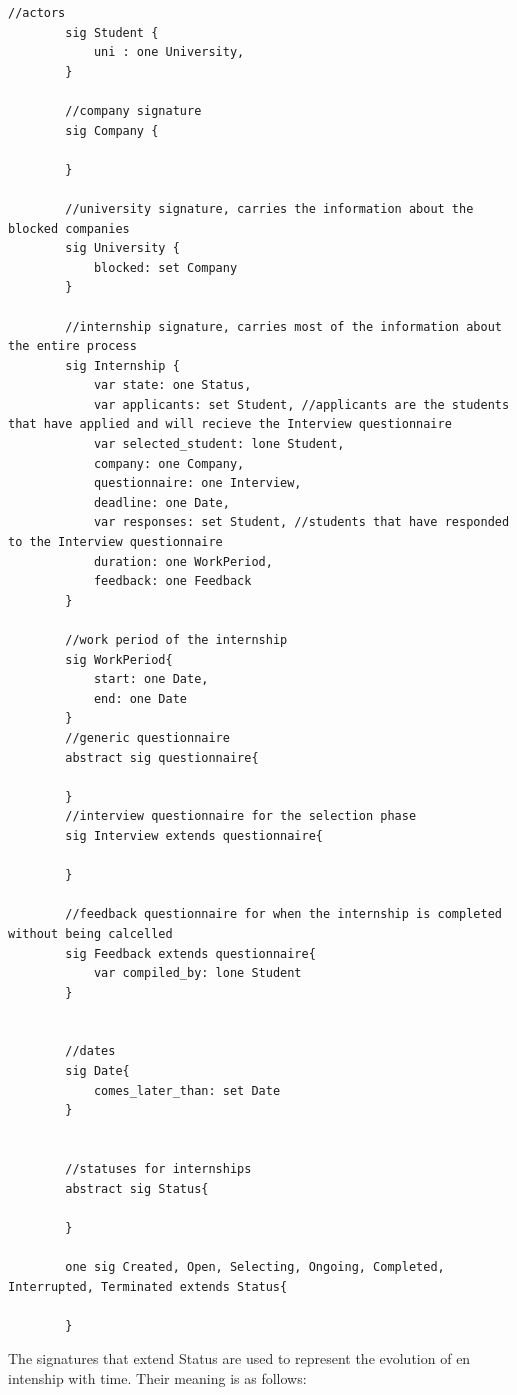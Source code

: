 \begin{lstlisting}[language=Alloy]
        //actors
        sig Student {
            uni : one University,
        }
        
        //company signature
        sig Company {
            
        }
         
        //university signature, carries the information about the blocked companies
        sig University {
            blocked: set Company
        }
        
        //internship signature, carries most of the information about the entire process
        sig Internship {
            var state: one Status,
            var applicants: set Student, //applicants are the students that have applied and will recieve the Interview questionnaire
            var selected_student: lone Student,
            company: one Company,
            questionnaire: one Interview,
            deadline: one Date,
            var responses: set Student, //students that have responded to the Interview questionnaire
            duration: one WorkPeriod,
            feedback: one Feedback
        }
        
        //work period of the internship
        sig WorkPeriod{
            start: one Date,
            end: one Date
        }
        //generic questionnaire
        abstract sig questionnaire{
            
        }
        //interview questionnaire for the selection phase
        sig Interview extends questionnaire{
            
        }
        
        //feedback questionnaire for when the internship is completed without being calcelled
        sig Feedback extends questionnaire{
            var compiled_by: lone Student
        }
        
        
        //dates 
        sig Date{
            comes_later_than: set Date
        }
        
        
        //statuses for internships
        abstract sig Status{
        
        }
        
        one sig Created, Open, Selecting, Ongoing, Completed, Interrupted, Terminated extends Status{
        
        }      
\end{lstlisting}
\par The signatures that extend Status are used to represent the evolution of en intenship with time. Their meaning is as follows:
